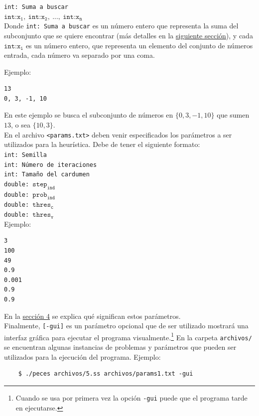 \documentclass[12pt]{article}
\begin{document}
\texttt{int: Suma a buscar} \\
$\texttt{int:x}_{\texttt{1}},\ \texttt{int:x}_{\texttt{2}},\ ...,\ \texttt{int:x}_{\texttt{n}}$ \\

Donde \texttt{int: Suma a buscar} es un número entero que representa la suma del subconjunto que se quiere encontrar (más detalles en la \hyperref[sec:ss]{siguiente sección}), y cada $\texttt{int:x}_{\texttt{i}}$ es un número entero, que representa un elemento del conjunto de números entrada, cada número va separado por una coma.

\newpage

Ejemplo:
\begin{verbatim}
13
0, 3, -1, 10
\end{verbatim}
En este ejemplo se busca el subconjunto de números en $\{0, 3, -1, 10\}$ que sumen $13$, o sea $\{10, 3\}$. \\

En el archivo \texttt{<params.txt>} deben venir especificados los parámetros a ser utilizados para la heurística. Debe de tener el siguiente formato: \\

\texttt{int: Semilla} \\
\texttt{int: Número de iteraciones} \\
\texttt{int: Tamaño del cardumen} \\
\texttt{double: $\texttt{step}_{\texttt{ind}}$} \\
\texttt{double: $\texttt{prob}_{\texttt{ind}}$} \\
\texttt{double: $\texttt{thres}_{\texttt{c}}$} \\
\texttt{double: $\texttt{thres}_{\texttt{v}}$} \\

Ejemplo:
\begin{verbatim}
3
100
49
0.9
0.001
0.9
0.9
\end{verbatim}

En la \hyperref[sec:bfss]{sección 4} se explica qué significan estos parámetros. \\

Finalmente, \texttt{[-gui]} es un parámetro opcional que de ser utilizado mostrará una interfaz gráfica para ejecutar el programa visualmente.\footnote{Cuando se usa por primera vez la opción \texttt{-gui} puede que el programa tarde en ejecutarse.} En la carpeta \texttt{archivos/} se encuentran algunas instancias de problemas y parámetros que pueden ser utilizados para la ejecución del programa. Ejemplo:
\begin{verbatim}
    $ ./peces archivos/5.ss archivos/params1.txt -gui
\end{verbatim}
\end{document}

